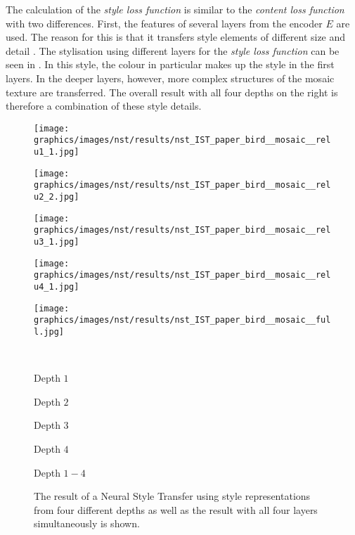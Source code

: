 The calculation of the \emph{style loss function} \styleloss{} is similar to the \emph{content loss function} \contentloss{} with two differences. First, the features of several layers from the encoder $E$ are used. The reason for this is that it transfers style elements of different size and detail \cite{Glas2021}. The stylisation using different layers for the \emph{style loss function} \styleloss{} can be seen in . In this style, the colour in particular makes up the style in the first layers. In the deeper layers, however, more complex structures of the mosaic texture are transferred. The overall result with all four depths on the right is therefore a combination of these style details.
\begin{figure}[h]
	\centering
	\begin{minipage}{.2\textwidth}
		\centering
		\texttt{[image: graphics/images/nst/results/nst\_IST\_paper\_bird\_\_mosaic\_\_relu1\_1.jpg]}
	\end{minipage}%
	\begin{minipage}{.2\textwidth}
		\centering
		\texttt{[image: graphics/images/nst/results/nst\_IST\_paper\_bird\_\_mosaic\_\_relu2\_2.jpg]}
	\end{minipage}%
	\begin{minipage}{.2\textwidth}
		\centering
		\texttt{[image: graphics/images/nst/results/nst\_IST\_paper\_bird\_\_mosaic\_\_relu3\_1.jpg]}
	\end{minipage}%
	\begin{minipage}{.2\textwidth}
		\centering
		\texttt{[image: graphics/images/nst/results/nst\_IST\_paper\_bird\_\_mosaic\_\_relu4\_1.jpg]}
	\end{minipage}%
	\begin{minipage}{.2\textwidth}
	\centering
	\texttt{[image: graphics/images/nst/results/nst\_IST\_paper\_bird\_\_mosaic\_\_full.jpg]}
	\end{minipage}\\ \vspace{0.15cm}
	\begin{minipage}{.2\textwidth}
		\centering
		Depth $1$
	\end{minipage}%
	\begin{minipage}{.2\textwidth}
		\centering
		Depth $2$
	\end{minipage}%
	\begin{minipage}{.2\textwidth}
		\centering
		Depth $3$
	\end{minipage}%
	\begin{minipage}{.2\textwidth}
		\centering
		Depth $4$
	\end{minipage}%
	\begin{minipage}{.2\textwidth}
		\centering
		Depth $1-4$
	\end{minipage}%
	\caption{The result of a Neural Style Transfer using style representations from four different depths as well as the result with all four layers simultaneously is shown.}
	\label{fig:diff_depth_nst}
\end{figure}

